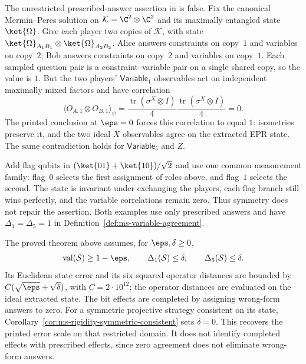 \begin{remark}
  \label{rem:ms-rigidity-strategy-class}
  The unrestricted prescribed-answer assertion in
  \cite[Section~7]{Ji2020MIPStar} is false. Fix the canonical Mermin--Peres
  solution on $\mathcal K=\C^2\otimes\C^2$ and its maximally entangled state
  $\ket{\Omega}$. Give each player two copies of $\mathcal K$, with state
  $\ket{\Omega}_{A_1B_1}\otimes\ket{\Omega}_{A_2B_2}$. Alice answers
  constraints on copy~$1$ and variables on copy~$2$; Bob answers constraints
  on copy~$2$ and variables on copy~$1$. Each sampled question pair is a
  constraint--variable pair on a single shared copy, so the value is $1$.
  But the two players' $\mathsf{Variable}_1$ observables act on independent
  maximally mixed factors and have correlation
  \[
    \langle O_{A,1}\otimes O_{B,1}\rangle_\psi
      =\frac{\operatorname{tr}(\sigma^X\otimes I)}4
       \frac{\operatorname{tr}(\sigma^X\otimes I)}4=0.
  \]
  The printed conclusion at $\eps=0$ forces this correlation to equal $1$:
  isometries preserve it, and the two ideal $X$ observables agree on the
  extracted EPR state. The same contradiction holds for
  $\mathsf{Variable}_5$ and $Z$.

  Add flag qubits in $(\ket{01}+\ket{10})/\sqrt2$ and use one common
  measurement family: flag~$0$ selects the first assignment of roles above,
  and flag~$1$ selects the second. The state is invariant under exchanging
  the players, each flag branch still wins perfectly, and the variable
  correlations remain zero. Thus symmetry does not repair the assertion.
  Both examples use only prescribed answers and have
  $\Delta_1=\Delta_5=1$ in Definition~\ref{def:ms-variable-agreement}.

  The proved theorem above assumes, for $\eps,\delta\ge0$,
  \[
    \operatorname{val}(\mathcal S)\ge1-\eps,\qquad
    \Delta_1(\mathcal S)\le\delta,\qquad
    \Delta_5(\mathcal S)\le\delta.
  \]
  Its Euclidean state error and its six squared operator distances are
  bounded by $C(\sqrt\eps+\sqrt\delta)$, with $C=2\cdot10^{12}$; the
  operator distances are evaluated on the ideal extracted state.
  The bit effects are completed by assigning wrong-form answers to zero.
  For a symmetric projective strategy consistent on its state,
  Corollary~\ref{cor:ms-rigidity-symmetric-consistent} sets $\delta=0$.
  This recovers the printed error scale on that restricted domain.
  It does not identify completed effects with prescribed effects, since
  zero agreement does not eliminate wrong-form answers.


\end{remark}
